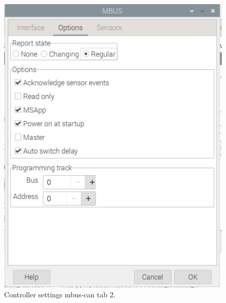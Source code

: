 \begin{figure}[h!]
	\centering
	\includegraphics[width=1.00\linewidth]{../figures/rocrailcontrollersettings/mbus_settings_tab2.png}
	\caption{Controller settings mbus-can tab 2.}
	\label{fig:mbus_settings_tab2}
\end{figure}

